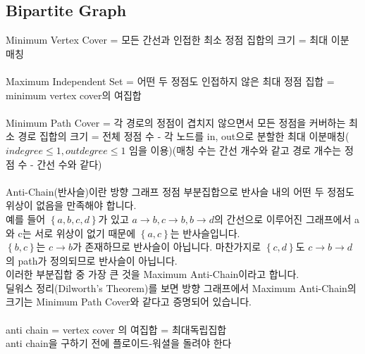 \documentclass[landscape, 8pt, a4paper, oneside, twocolumn]{extarticle}
\begin{document}
	\subsection {Bipartite Graph}
		\noindent
		Minimum Vertex Cover = 모든 간선과 인접한 최소 정점 집합의 크기 = 최대 이분 매칭\\\\
		Maximum Independent Set = 어떤 두 정점도 인접하지 않은 최대 정점 집합 = minimum vertex cover의 여집합\\\\
		Minimum Path Cover = 각 경로의 정점이 겹치지 않으면서 모든 정점을 커버하는 최소 경로 집합의 크기 = 전체 정점 수 - 각 노드를 in, out으로 분할한 최대 이분매칭($indegree \leq 1, outdegree \leq 1$ 임을 이용)(매칭 수는 간선 개수와 같고 경로 개수는 정점 수 - 간선 수와 같다)\\\\
		Anti-Chain(반사슬)이란 방향 그래프 정점 부분집합으로 반사슬 내의 어떤 두 정점도 위상이 없음을 만족해야 합니다.\\
		예를 들어 $\left \{ a, b, c, d \right \}$가 있고 $a\rightarrow b, c\rightarrow b, b\rightarrow d$의 간선으로 이루어진 그래프에서 a와 c는 서로 위상이 없기 때문에 $\left \{ a, c \right \}$는 반사슬입니다.\\
		$\left \{ b, c \right \}$는 $c\rightarrow b$가 존재하므로 반사슬이 아닙니다. 마찬가지로 $\left \{ c, d \right \}$도 $c\rightarrow b\rightarrow d$의 path가 정의되므로 반사슬이 아닙니다.\\
		이러한 부분집합 중 가장 큰 것을 Maximum Anti-Chain이라고 합니다.\\
		딜워스 정리(Dilworth’s Theorem)를 보면 방향 그래프에서 Maximum Anti-Chain의 크기는 Minimum Path Cover와 같다고 증명되어 있습니다.\\\\
		anti chain = vertex cover 의 여집합 = 최대독립집합\\
		anti chain을 구하기 전에 플로이드-워셜을 돌려야 한다
\end{document}
